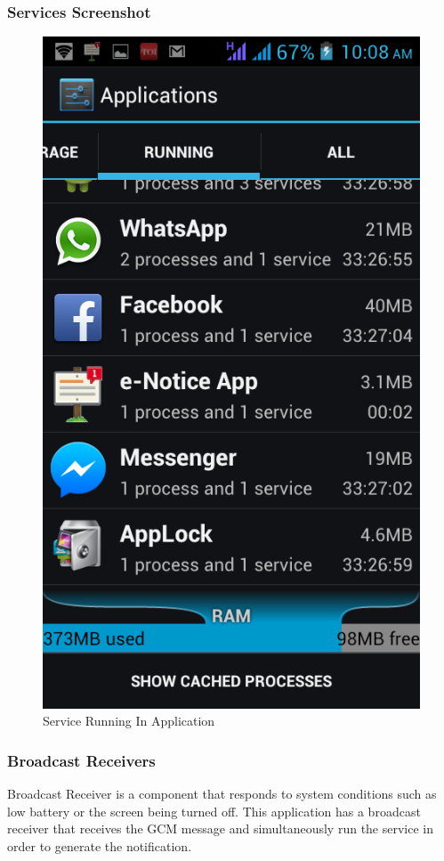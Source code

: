 \documentclass{beamer}   %
\begin{document}
\begin{frame}
\frametitle{Services Screenshot}
\begin{figure}
\includegraphics[scale=0.2]{image/service.png}
\caption{Service Running In Application}
\end{figure}

\end{frame}

\begin{frame}
\frametitle{Broadcast Receivers}
Broadcast Receiver is a component that responds to system conditions such as low battery or the screen being turned off.
This application has a broadcast receiver that receives the GCM message and simultaneously run the service in order to generate the 
notification.
 
\end{frame}
\end{document}

